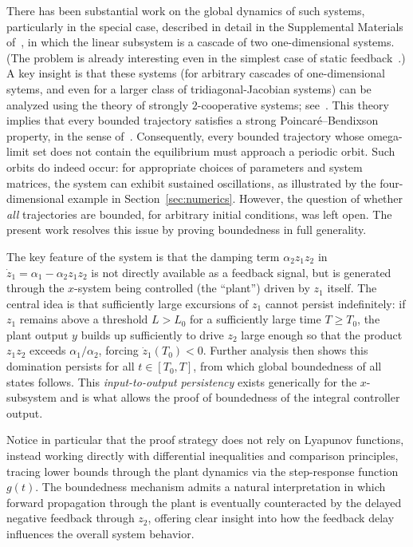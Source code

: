 \documentclass{article}
\begin{document}
There has been substantial work on the global dynamics of such systems, particularly in the special case, described in detail in the Supplemental Materials of~\cite{AFC2016}, in which the linear subsystem is a cascade of two one-dimensional systems. (The problem is already interesting even in the simplest case of static feedback~\cite{olsman2019antithetic}.) A key insight is that these systems (for arbitrary cascades of one-dimensional sytems, and even for a larger class of tridiagonal-Jacobian systems) can be analyzed using the theory of strongly $2$-cooperative systems; see~\cite{2019biorxiv_margaliot_sontag,katz2025instability,Margaliot-CDC}. This theory implies that every bounded trajectory satisfies a strong Poincar\'e--Bendixson property, in the sense of~\cite{Eyal_k_posi}. Consequently, every bounded trajectory whose omega-limit set does not contain the equilibrium must approach a periodic orbit. Such orbits do indeed occur: for appropriate choices of parameters and system matrices, the system can exhibit sustained oscillations, as illustrated by the four-dimensional example in Section~\ref{sec:numerics}. However, the question of whether \textit{all} trajectories are bounded, for arbitrary initial conditions, was left open. The present work resolves this issue by proving boundedness in full generality.

The key feature of the system is that the damping term $\alpha_2 z_1 z_2$ in $\dot z_1 = \alpha_1 - \alpha_2 z_1 z_2$ is not directly available as a feedback signal, but is generated through the $x$-system being controlled (the ``plant'') driven by $z_1$ itself. The central idea is that sufficiently large excursions of $z_1$ cannot persist indefinitely: if $z_1$ remains above a threshold $L > L_0$ for a sufficiently large time $T \ge T_0$, the plant output $y$ builds up sufficiently to drive $z_2$ large enough so that the product $z_1 z_2$ exceeds $\alpha_1/\alpha_2$, forcing $\dot{z}_1(T_0) < 0$. 
Further analysis then shows this domination persists for all $t \in [T_0, T]$, from which global boundedness of all states follows.
This \emph{input-to-output persistency} exists generically for the $x$-subsystem and is what allows the proof of boundedness of the integral controller output.

Notice in particular that the proof strategy does not rely on Lyapunov functions, instead working directly with differential inequalities and comparison principles, tracing lower bounds through the plant dynamics via the step-response function $g(t)$. The boundedness mechanism admits a natural interpretation 
in which forward propagation through the plant is eventually counteracted by the delayed negative feedback through $z_2$, offering clear insight into how the feedback delay influences the overall system behavior.
\end{document}
